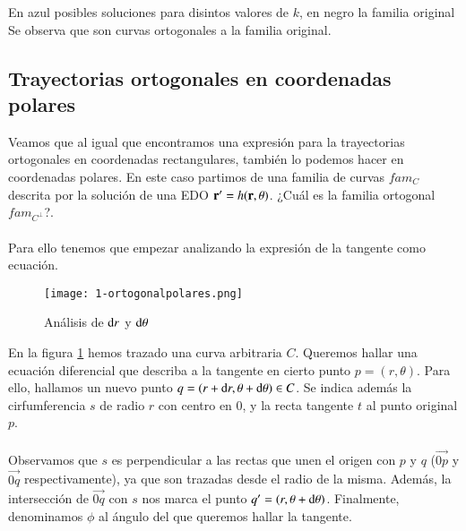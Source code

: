 \begin{eg}
\begin{center}
\hfill \break
        \vspace{1pt}
        En azul posibles soluciones para disintos valores de $k$, en negro la familia original\\
        Se observa que son curvas ortogonales a la familia original.
    \end{center}
\end{eg}

\subsection{Trayectorias ortogonales en coordenadas polares}
Veamos que al igual que encontramos una expresión para la trayectorias ortogonales en coordenadas rectangulares, también lo podemos hacer en coordenadas polares. En este caso partimos de una familia de curvas $fam_C$ descrita por la solución de una EDO $\mathbf{r'} = h(\mathbf{r}, \theta)$. ¿Cuál es la familia ortogonal $fam_{C^\perp}$?.\\\\
Para ello tenemos que empezar analizando la expresión de la tangente como ecuación.

\begin{wrapfigure}{l}{.6\textwidth}
  \begin{center}
    \texttt{[image: 1-ortogonalpolares.png]}
  \end{center}
  \caption{Análisis de $\mathrm{d} r$ y $\mathrm{d} \theta$}\label{img:1-polort}
\end{wrapfigure}
En la figura \ref{img:1-polort} hemos trazado una curva arbitraria $C$. Queremos hallar una ecuación diferencial que describa a la tangente en cierto punto $p = (r,\theta)$. Para ello, hallamos un nuevo punto $q = (r + \mathrm{d} r, \theta +\mathrm{d} \theta) \in C$. Se indica además la cirfumferencia $s$ de radio $r$ con centro en $0$, y la recta tangente $t$ al punto original $p$.\\\\
Observamos que $s$ es perpendicular a las rectas que unen el origen con $p$ y $q$ ($\vec{0p}$ y $\vec{0q}$ respectivamente), ya que son trazadas desde el radio de la misma. Además, la intersección de $\vec{0q}$ con $s$ nos marca el punto $q' = (r, \theta +\mathrm{d} \theta)$. Finalmente, denominamos $\phi$ al ángulo del que queremos hallar la tangente.

